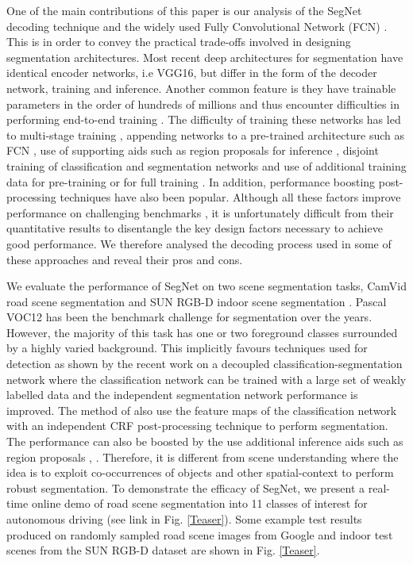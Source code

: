 \documentclass[10pt,journal,compsoc]{IEEEtran}
\begin{document}
One of the main contributions of this paper is our analysis of the SegNet decoding technique and the widely used Fully Convolutional Network (FCN) \cite{FCN}. This is in order to convey the practical trade-offs involved in designing segmentation architectures. Most recent deep architectures for segmentation have identical encoder networks, i.e VGG16, but differ in the form of the decoder network, training and inference. Another common feature is they have trainable parameters in the order of hundreds of millions and thus encounter difficulties in performing end-to-end training \cite{noh2015learning}. The difficulty of training these networks has led to multi-stage training \cite{FCN}, appending networks to a pre-trained architecture such as FCN \cite{zheng2015conditional}, use of supporting aids such as region proposals for inference \cite{noh2015learning}, disjoint training of classification and segmentation networks \cite{hong2015decoupled} and use of additional training data for pre-training \cite{ParseNetRabinovich} \cite{mottaghi2014role} or for full training \cite{zheng2015conditional}. In addition, performance boosting post-processing techniques \cite{liang2015semantic} have also been popular. Although all these factors improve performance on challenging benchmarks \cite{Pascal}, it is unfortunately difficult from their quantitative results to disentangle the key design factors necessary to achieve good performance. We therefore analysed the decoding process used in some of these approaches \cite{FCN,noh2015learning} and reveal their pros and cons.

We evaluate the performance of SegNet on two scene segmentation tasks, CamVid road scene segmentation \cite{GabeDataset} and SUN RGB-D indoor scene segmentation \cite{song2015sun}. Pascal VOC12 \cite{Pascal} has been the benchmark challenge for segmentation over the years. However, the majority of this task has one or two foreground classes surrounded by a highly varied background. This implicitly favours techniques used for detection as shown by the recent work on a decoupled classification-segmentation network \cite{hong2015decoupled} where the classification network can be trained with a large set of weakly labelled data and the independent segmentation network performance is improved. The method of \cite{liang2015semantic} also use the feature maps of the classification network with an independent CRF post-processing technique to perform segmentation. The performance can also be boosted by the use additional inference aids such as region proposals \cite{noh2015learning}, \cite{zitnick2014edge}. Therefore, it is different from scene understanding where the idea is to exploit co-occurrences of objects and other spatial-context to perform robust segmentation. To demonstrate the efficacy of SegNet, we present a real-time online demo of road scene segmentation into 11 classes of interest for autonomous driving (see link in Fig. \ref{Teaser}). Some example test results produced on randomly sampled road scene images from Google and indoor test scenes from the SUN RGB-D dataset \cite{song2015sun} are shown in Fig. \ref{Teaser}. 
\end{document}
